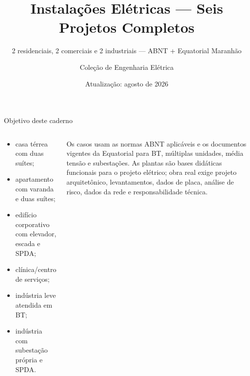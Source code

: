 \documentclass[11pt,aspectratio=169]{beamer}
\title{Instalações Elétricas — Seis Projetos Completos}
\subtitle{2 residenciais, 2 comerciais e 2 industriais — ABNT + Equatorial Maranhão}
\author{Coleção de Engenharia Elétrica}
\institute{Material 03 — caderno de projetos}
\date{Atualização: agosto de 2026}
\begin{document}
{\begin{frame}\titlepage\end{frame}}
\begin{frame}{Objetivo deste caderno}
\small
\begin{columns}[T,onlytextwidth]
\begin{caixaProjeto}[title=Seis arquiteturas diferentes]
\begin{itemize}
\item casa térrea com duas suítes;
\item apartamento com varanda e duas suítes;
\item edifício corporativo com elevador, escada e SPDA;
\item clínica/centro de serviços;
\item indústria leve atendida em BT;
\item indústria com subestação própria e SPDA.
\end{itemize}
\end{caixaProjeto}
\begin{caixaNorma}[title=Base técnica]
Os casos usam as normas ABNT aplicáveis e os documentos vigentes da Equatorial para BT, múltiplas unidades, média tensão e subestações. As plantas são bases didáticas funcionais para o projeto elétrico; obra real exige projeto arquitetônico, levantamentos, dados de placa, análise de risco, dados da rede e responsabilidade técnica.
\end{caixaNorma}
\end{columns}
\end{frame}

\begin{frame}[plain]
\end{frame}
\end{document}
